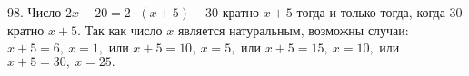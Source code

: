 98. Число $2x-20=2\cdot(x+5)-30$ кратно $x+5$ тогда и только тогда, когда 30 кратно $x+5.$ Так как число $x$ является натуральным, возможны случаи: $x+5=6,\ x=1,$ или $x+5=10,\ x=5,$ или $x+5=15,\ x=10,$ или $x+5=30,\ x=25.$\\
